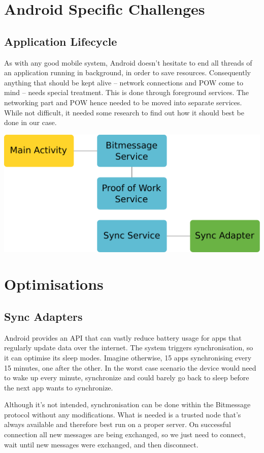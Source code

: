 \documentclass{bfh}
\begin{document}
  \section{Android Specific Challenges}
  \subsection{Application Lifecycle}
  As with any good mobile system, Android doesn't hesitate to end all threads of an application running in background, in order to save resources. Consequently anything that should be kept alive -- network connections and \ac{POW} come to mind -- needs special treatment. This is done through foreground services. The networking part and \ac{POW} hence needed to be moved into separate services. While not difficult, it needed some research to find out how it should best be done in our case.

  \begin{center}
    \includegraphics[width=0.6 \textwidth]{images/services.pdf}
  \end{center}

  \section{Optimisations}
  \subsection{Sync Adapters}
  Android provides an API that can vastly reduce battery usage for apps that regularly update data over the internet. The system triggers synchronisation, so it can optimise its sleep modes. Imagine otherwise, 15 apps synchronising every 15 minutes, one after the other. In the worst case scenario the device would need to wake up every minute, synchronize and could barely go back to sleep before the next app wants to synchronize.

  Although it's not intended, synchronisation can be done within the Bitmessage protocol without any modifications. What is needed is a trusted node that's always available and therefore best run on a proper server. On successful connection all new messages are being exchanged, so we just need to connect, wait until new messages were exchanged, and then disconnect.
\end{document}
